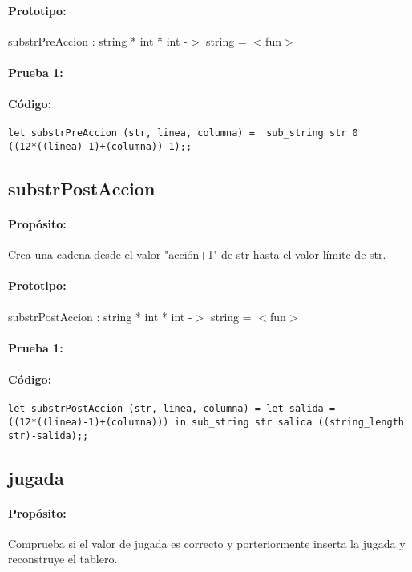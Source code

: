 \paragraph{Prototipo:} substrPreAccion : string * int * int -$>$ string = $<$fun$>$
\paragraph{Prueba 1:}
\paragraph{Código:}
\begin{verbatim}
let substrPreAccion (str, linea, columna) =  sub_string str 0 
((12*((linea)-1)+(columna))-1);;
\end{verbatim}

\subsection{substrPostAccion}

\paragraph{Propósito:} Crea una cadena desde el valor "acción+1" de str hasta el valor
límite de str.
\paragraph{Prototipo:} substrPostAccion : string * int * int -$>$ string = $<$fun$>$
\paragraph{Prueba 1:}
\paragraph{Código:}
\begin{verbatim}
let substrPostAccion (str, linea, columna) = let salida =
((12*((linea)-1)+(columna))) in sub_string str salida ((string_length
str)-salida);;
\end{verbatim}

\subsection{jugada}

\paragraph{Propósito:} Comprueba si el valor de jugada es correcto y porteriormente inserta
la jugada y reconstruye el tablero.
